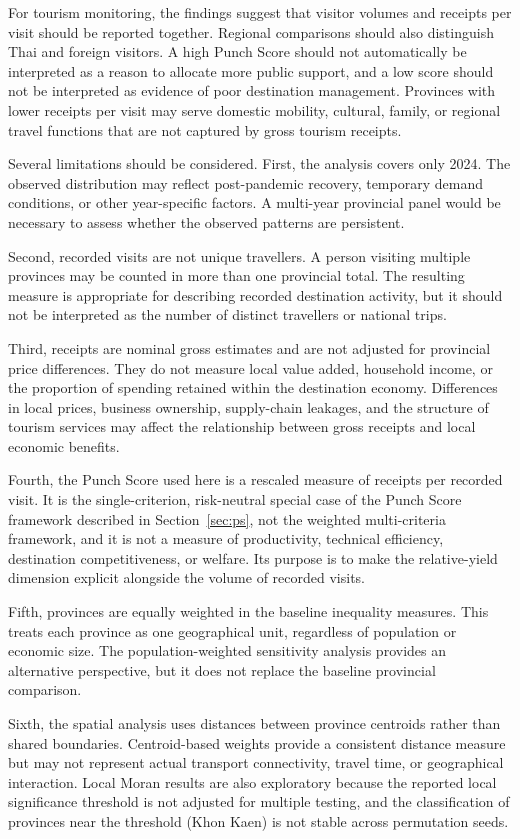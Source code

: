\documentclass[11pt,a4paper]{article}
\begin{document}
For tourism monitoring, the findings suggest that visitor volumes and receipts per visit should be reported together. Regional comparisons should also distinguish Thai and foreign visitors. A high Punch Score should not automatically be interpreted as a reason to allocate more public support, and a low score should not be interpreted as evidence of poor destination management. Provinces with lower receipts per visit may serve domestic mobility, cultural, family, or regional travel functions that are not captured by gross tourism receipts.

Several limitations should be considered. First, the analysis covers only 2024. The observed distribution may reflect post-pandemic recovery, temporary demand conditions, or other year-specific factors. A multi-year provincial panel would be necessary to assess whether the observed patterns are persistent.

Second, recorded visits are not unique travellers. A person visiting multiple provinces may be counted in more than one provincial total. The resulting measure is appropriate for describing recorded destination activity, but it should not be interpreted as the number of distinct travellers or national trips.

Third, receipts are nominal gross estimates and are not adjusted for provincial price differences. They do not measure local value added, household income, or the proportion of spending retained within the destination economy. Differences in local prices, business ownership, supply-chain leakages, and the structure of tourism services may affect the relationship between gross receipts and local economic benefits.

Fourth, the Punch Score used here is a rescaled measure of receipts per recorded visit. It is the single-criterion, risk-neutral special case of the Punch Score framework described in Section~\ref{sec:ps}, not the weighted multi-criteria framework, and it is not a measure of productivity, technical efficiency, destination competitiveness, or welfare. Its purpose is to make the relative-yield dimension explicit alongside the volume of recorded visits.

Fifth, provinces are equally weighted in the baseline inequality measures. This treats each province as one geographical unit, regardless of population or economic size. The population-weighted sensitivity analysis provides an alternative perspective, but it does not replace the baseline provincial comparison.

Sixth, the spatial analysis uses distances between province centroids rather than shared boundaries. Centroid-based weights provide a consistent distance measure but may not represent actual transport connectivity, travel time, or geographical interaction. Local Moran results are also exploratory because the reported local significance threshold is not adjusted for multiple testing, and the classification of provinces near the threshold (Khon Kaen) is not stable across permutation seeds.
\end{document}
